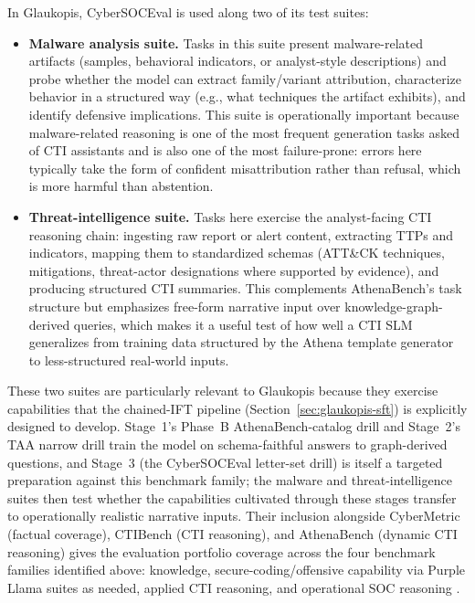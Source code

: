 \documentclass[conference]{IEEEtran}
\begin{document}
In Glaukopis, CyberSOCEval is used along two of its test suites:

\begin{itemize}
  \item \textbf{Malware analysis suite.} Tasks in this suite present malware-related artifacts (samples, behavioral indicators, or analyst-style descriptions) and probe whether the model can extract family/variant attribution, characterize behavior in a structured way (e.g., what techniques the artifact exhibits), and identify defensive implications. This suite is operationally important because malware-related reasoning is one of the most frequent generation tasks asked of CTI assistants and is also one of the most failure-prone: errors here typically take the form of confident misattribution rather than refusal, which is more harmful than abstention.
  \item \textbf{Threat-intelligence suite.} Tasks here exercise the analyst-facing CTI reasoning chain: ingesting raw report or alert content, extracting TTPs and indicators, mapping them to standardized schemas (ATT\&CK techniques, mitigations, threat-actor designations where supported by evidence), and producing structured CTI summaries. This complements AthenaBench's task structure but emphasizes free-form narrative input over knowledge-graph-derived queries, which makes it a useful test of how well a CTI SLM generalizes from training data structured by the Athena template generator to less-structured real-world inputs.
\end{itemize}

These two suites are particularly relevant to Glaukopis because they exercise capabilities that the chained-IFT pipeline (Section~\ref{sec:glaukopis-sft}) is explicitly designed to develop. Stage~1's Phase~B AthenaBench-catalog drill and Stage~2's TAA narrow drill train the model on schema-faithful answers to graph-derived questions, and Stage~3 (the CyberSOCEval letter-set drill) is itself a targeted preparation against this benchmark family; the malware and threat-intelligence suites then test whether the capabilities cultivated through these stages transfer to operationally realistic narrative inputs. Their inclusion alongside CyberMetric (factual coverage), CTIBench (CTI reasoning), and AthenaBench (dynamic CTI reasoning) gives the evaluation portfolio coverage across the four benchmark families identified above: knowledge, secure-coding/offensive capability via Purple Llama suites as needed, applied CTI reasoning, and operational SOC reasoning \cite{tihanyi2024cybermetric,alam2024ctibench,alam2025athenabench,bhatt2023purplellama,bhatt2024cyberseceval2,cybersoceval2025}.
\end{document}
